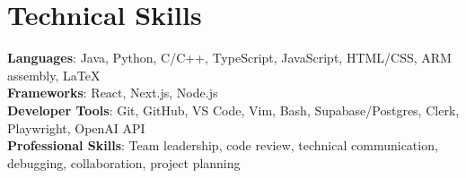 \documentclass[letterpaper,11pt]{article}
\begin{document}
\section{Technical Skills}
 \begin{itemize}[leftmargin=0.15in, label={}]
    \small{\item{
     \textbf{Languages}{: Java, Python, C/C++, TypeScript, JavaScript, HTML/CSS, ARM assembly, LaTeX} \\
     \textbf{Frameworks}{: React, Next.js, Node.js} \\
     \textbf{Developer Tools}{: Git, GitHub, VS Code, Vim, Bash, Supabase/Postgres, Clerk, Playwright, OpenAI API} \\
     \textbf{Professional Skills}{: Team leadership, code review, technical communication, debugging, collaboration, project planning} \\
    }}
 \end{itemize}


\end{document}
